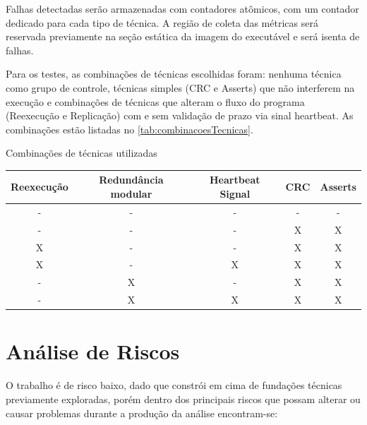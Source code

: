 Falhas detectadas serão armazenadas com contadores atômicos, com um contador dedicado para cada tipo de técnica. A região de coleta das métricas será reservada previamente na seção estática da imagem do executável e será isenta de falhas.

Para os testes, as combinações de técnicas escolhidas foram: nenhuma técnica como grupo de controle, técnicas simples (CRC e Asserts) que não interferem na execução e combinações de técnicas que alteram o fluxo do programa (Reexecução e Replicação) com e sem validação de prazo via sinal heartbeat. As combinações estão listadas no \autoref{tab:combinacoesTecnicas}.

\begin{quadro}[H]
    \centering
    \caption{Combinações de técnicas utilizadas}
    \begin{tabular}{|c|c|c|c|c|}
        \hline
        \rowcolor[HTML]{C0C0C0}
        \textbf{Reexecução} & \textbf{Redundância modular} & \textbf{Heartbeat Signal} & \textbf{CRC} & \textbf{Asserts} \\
        \hline
        - & - & - & - & - \\
        \hline
        - & - & - & X & X \\
        \hline
        X & - & - & X & X \\
        \hline
        X & - & X & X & X \\
        \hline
        - & X & - & X & X \\
        \hline
        - & X & X & X & X \\
        \hline
    \end{tabular}
    \label{tab:combinacoesTecnicas}
\end{quadro}


\section{Análise de Riscos} \label{sec:analiseRiscos}

O trabalho é de risco baixo, dado que constrói em cima de fundações técnicas previamente exploradas, porém dentro dos principais riscos que possam alterar ou causar problemas durante a produção da análise encontram-se:

